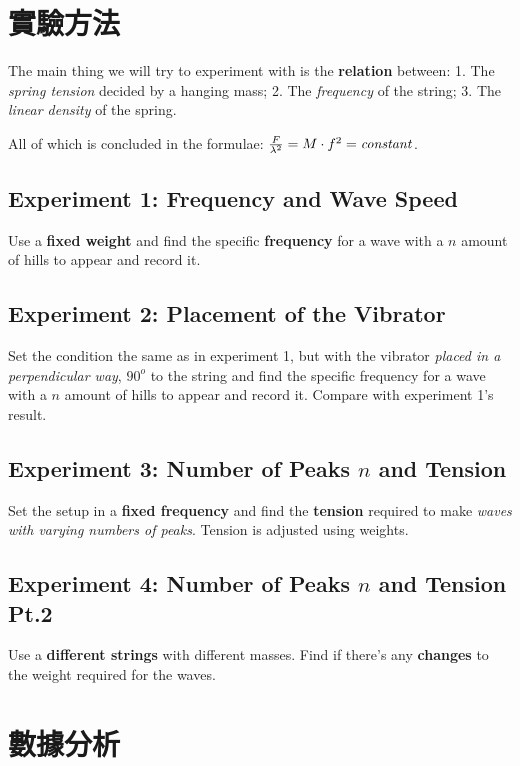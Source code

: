 \documentclass[12pt]{article}
\begin{document}
\section{\textbf{實驗方法}}
The main thing we will try to experiment with is the \textbf{relation} between: 1. The \textit{spring tension} decided by a hanging mass; 2. The \textit{frequency} of the string;
3. The\textit{ linear density} of the spring. 

All of which is concluded in the formulae: $\frac{F}{\lambda^2} = M \cdot f^2 = \text{\textit{constant}}$.

\subsection{Experiment 1: Frequency and Wave Speed}
Use a \textbf{fixed weight} and find the specific \textbf{frequency} for a wave with a $n$ amount of hills to appear and record it.

\subsection{Experiment 2: Placement of the Vibrator}
Set the condition the same as in experiment 1, but with the vibrator \textit{placed in a perpendicular way}, $90^{o}$ to the string and find the specific frequency for a wave with a $n$ amount of hills to appear and record it. Compare with experiment 1's result.

\subsection{Experiment 3: Number of Peaks $n$ and Tension}
Set the setup in a \textbf{fixed frequency} and find the \textbf{tension} required to make\textit{ waves with varying numbers of peaks}. Tension is adjusted using weights.

\subsection{Experiment 4: Number of Peaks $n$ and Tension Pt.2}
Use a \textbf{different strings} with different masses. Find if there's any \textbf{changes} to the weight required for the waves.


\section{\textbf{數據分析}}
\end{document}
